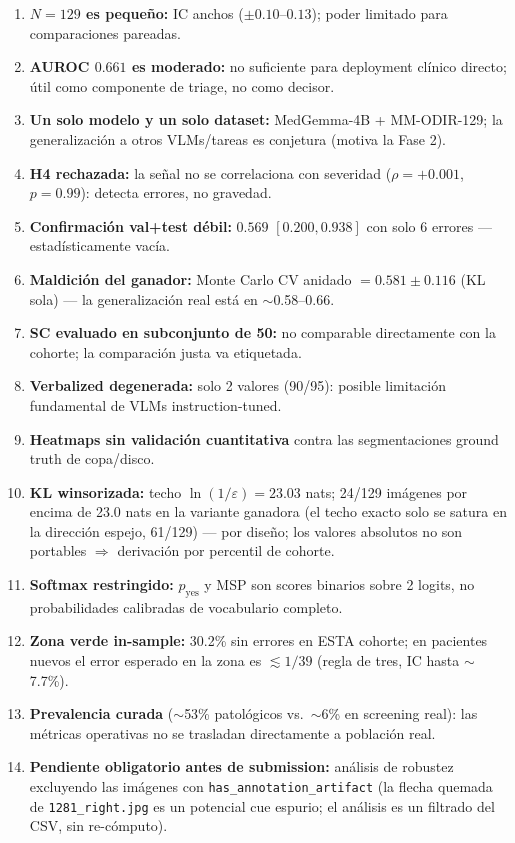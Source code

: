 \documentclass[12pt,a4paper]{article}
\begin{document}
\begin{enumerate}[leftmargin=1.6em]
    \item \textbf{$N = 129$ es pequeño:} IC anchos ($\pm 0.10$--$0.13$);
    poder limitado para comparaciones pareadas.
    \item \textbf{AUROC $0.661$ es moderado:} no suficiente para
    deployment clínico directo; útil como componente de triage, no como
    decisor.
    \item \textbf{Un solo modelo y un solo dataset:} MedGemma-4B +
    MM-ODIR-129; la generalización a otros VLMs/tareas es conjetura
    (motiva la Fase 2).
    \item \textbf{H4 rechazada:} la señal no se correlaciona con severidad
    ($\rho = +0.001$, $p = 0.99$): detecta errores, no gravedad.
    \item \textbf{Confirmación val+test débil:} $0.569$ $[0.200, 0.938]$
    con solo 6 errores --- estadísticamente vacía.
    \item \textbf{Maldición del ganador:} Monte Carlo CV anidado $= 0.581
    \pm 0.116$ (KL sola) --- la generalización real está en
    $\sim$0.58--0.66.
    \item \textbf{SC evaluado en subconjunto de 50:} no comparable
    directamente con la cohorte; la comparación justa va etiquetada.
    \item \textbf{Verbalized degenerada:} solo 2 valores (90/95):
    posible limitación fundamental de VLMs instruction-tuned.
    \item \textbf{Heatmaps sin validación cuantitativa} contra las
    segmentaciones ground truth de copa/disco.
    \item \textbf{KL winsorizada:} techo $\ln(1/\varepsilon) = 23.03$
    nats; 24/129 imágenes por encima de 23.0 nats en la variante ganadora
    (el techo exacto solo se satura en la dirección espejo, 61/129) ---
    por diseño; los valores absolutos no son portables $\Rightarrow$
    derivación por percentil de cohorte.
    \item \textbf{Softmax restringido:} $p_{\mathrm{yes}}$ y MSP son
    scores binarios sobre 2 logits, no probabilidades calibradas de
    vocabulario completo.
    \item \textbf{Zona verde in-sample:} 30.2\% sin errores en ESTA
    cohorte; en pacientes nuevos el error esperado en la zona es
    $\lesssim 1/39$ (regla de tres, IC hasta $\sim$7.7\%).
    \item \textbf{Prevalencia curada} ($\sim$53\% patológicos vs.\
    $\sim$6\% en screening real): las métricas operativas no se trasladan
    directamente a población real.
    \item \textbf{Pendiente obligatorio antes de submission:} análisis de
    robustez excluyendo las imágenes con \texttt{has\_annotation\_artifact}
    (la flecha quemada de \texttt{1281\_right.jpg} es un potencial cue
    espurio; el análisis es un filtrado del CSV, sin re-cómputo).
\end{enumerate}
\end{document}
